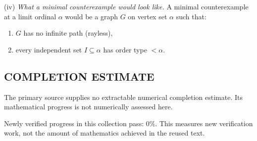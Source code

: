 (iv) \emph{What a minimal counterexample would look like.} A minimal counterexample at a limit ordinal $\alpha$ would be a graph $G$ on vertex set $\alpha$ such that:
\begin{enumerate}
\item $G$ has no infinite path (rayless),
\item every independent set $I\subseteq\alpha$ has order type $<\alpha$.
\end{enumerate}




\subsection*{COMPLETION ESTIMATE}
The primary source supplies no extractable numerical completion estimate. Its mathematical progress is not numerically assessed here.

Newly verified progress in this collection pass: $0\%$. This measures new verification work, not the amount of mathematics achieved in the reused text.
